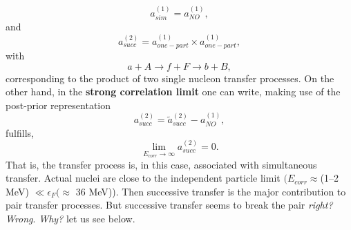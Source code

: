 %



\begin{equation}
a_{sim}^{(1)}=a_{NO}^{(1)},
\end{equation}
and
\begin{equation}
a_{succ}^{(2)}=a_{one-part}^{(1)}\times a_{one-part}^{(1)},
\end{equation}
\vspace{0.2cm}
with
\begin{equation}
a+A\rightarrow f+F \rightarrow b+B,
\end{equation}         
corresponding to the product of two single nucleon transfer processes.
On the other hand, in the \textbf{strong correlation limit} one can write, making use of the
post-prior representation
\begin{equation}
 a_{succ}^{(2)}= \tilde a_{succ}^{(2)}-a_{NO}^{(1)},
\end{equation}
fulfills,
\begin{equation}
\lim_{E_{corr}\rightarrow \infty}  a_{succ}^{(2)}=0.
\end{equation}
That is, the transfer process is, in this case, associated with  simultaneous transfer.
Actual nuclei are close to the independent particle limit $(E_{corr}\approx$(1--2 MeV) $\ll \epsilon_F(\approx$ 36 MeV)). Then successive transfer is the major contribution to pair transfer processes. But successive transfer seems to break the pair \textit{right?} \textit{Wrong}. \textit{Why?} let us see below.
